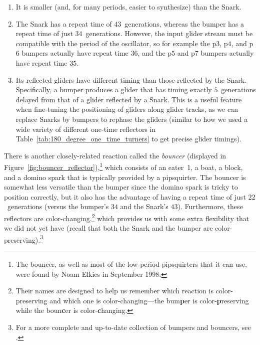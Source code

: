 \begin{enumerate}
	\item[1)] It is smaller (and, for many periods, easier to synthesize) than the Snark.\smallskip
	
	\item[2)] The Snark has a repeat time of $43$~generations, whereas the bumper has a repeat time of just $34$~generations. However, the input glider stream must be compatible with the period of the oscillator, so for example the p$3$, p$4$, and p$6$ bumpers actually have repeat time $36$, and the p$5$ and p$7$ bumpers actually have repeat time $35$.\smallskip
	
	\item[3)] Its reflected gliders have different timing than those reflected by the Snark. Specifically, a bumper produces a glider that has timing exactly $5$~generations delayed from that of a glider reflected by a Snark. This is a useful feature when fine-tuning the positioning of gliders along glider tracks, as we can replace Snarks by bumpers to rephase the gliders (similar to how we used a wide variety of different one-time reflectors in Table~\ref{tab:180_degree_one_time_turners} to get precise glider timings).\smallskip
\end{enumerate}

There is another closely-related reaction called the \emph{bouncer} (displayed in Figure~\ref{fig:bouncer_reflector}),\footnote{The bouncer, as well as most of the low-period pipsquirters that it can use, were found by Noam Elkies in September 1998.} which consists of an eater~1, a boat, a block, and a domino spark that is typically provided by a pipsquirter. The bouncer is somewhat less versatile than the bumper since the domino spark is tricky to position correctly, but it also has the advantage of having a repeat time of just $22$~generations (versus the bumper's $34$ and the Snark's $43$). Furthermore, these reflectors are color-changing,\footnote{Their names are designed to help us remember which reaction is color-preserving and which one is color-changing---the bum\textbf{p}er is color-\textbf{p}reserving while the boun\textbf{c}er is color-\textbf{c}hanging.} which provides us with some extra flexibility that we did not yet have (recall that both the Snark and the bumper are color-preserving).\footnote{For a more complete and up-to-date collection of bumpers and bouncers, see .}

